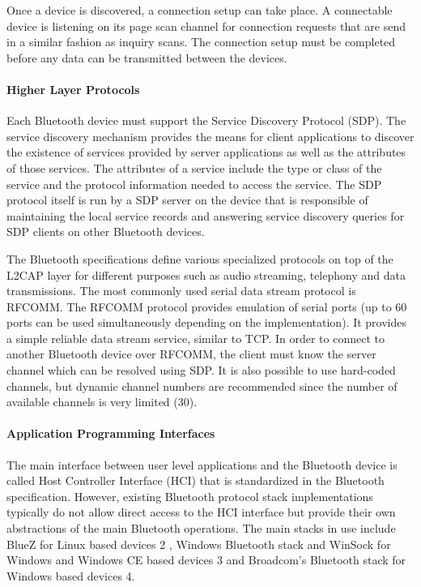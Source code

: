 Once a device is discovered, a connection setup can take place. A connectable device is listening on its page scan channel for connection requests that are send in a
similar fashion as inquiry scans. The connection setup must be completed before any data can be transmitted between the devices.

\paragraph*{Higher Layer Protocols}

Each Bluetooth device must support the Service Discovery Protocol (SDP). The service discovery mechanism provides the means for client applications to discover
the existence of services provided by server applications as well as the attributes of those services. The attributes of a service include the type or class of the service and
the protocol information needed to access the service. The SDP protocol itself is run by a SDP server on the device that is responsible of maintaining the local service records
and answering service discovery queries for SDP clients on other Bluetooth devices.

The Bluetooth specifications define various specialized protocols on top of the L2CAP layer for different purposes such as audio streaming, telephony and data
transmissions. The most commonly used serial data stream protocol is RFCOMM. The RFCOMM protocol provides emulation of serial ports (up to 60 ports can be used
simultaneously depending on the implementation). It provides a simple reliable data stream service, similar to TCP. In order to connect to another Bluetooth device over
RFCOMM, the client must know the server channel which can be resolved using SDP. It is also possible to use hard-coded channels, but dynamic channel numbers are 
recommended since the number of available channels is very limited (30).


\paragraph*{Application Programming Interfaces}

The main interface between user level applications and the Bluetooth device is
called Host Controller Interface (HCI) that is standardized in the Bluetooth specification. However, existing Bluetooth protocol stack implementations typically do not
allow direct access to the HCI interface but provide their own abstractions of the main Bluetooth operations. The main stacks in use include BlueZ for Linux based devices 2 ,
Windows Bluetooth stack and WinSock for Windows and Windows CE based devices 3 and Broadcom's Bluetooth stack for Windows based devices 4.

